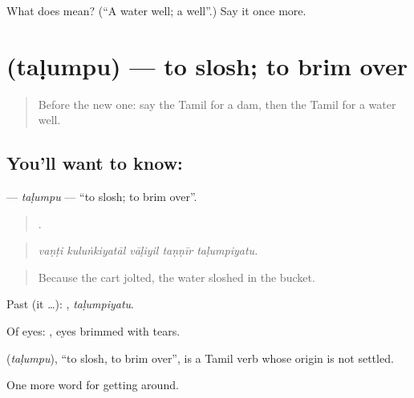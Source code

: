 \begin{tcolorbox}[breakable,colback=teal!4,colframe=teal!35!black,title={Before you move on}]
What does  mean? (\textquotedblleft{}A water well; a well\textquotedblright{}.) Say it once more.
\end{tcolorbox}
\section[\texorpdfstring{\ta{தளும்பு} (taḷumpu)}{தளும்பு (taḷumpu)}]{ (taḷumpu) — to slosh; to brim over}

\label{lesson:TA-C432-talumpu}



\begin{quote}
Before the new one: say the Tamil for a dam, then the Tamil for a water well.
\end{quote}

\subsection*{You'll want to know: }
\textbf{} — \emph{taḷumpu} — \textquotedblleft{}to slosh; to brim over\textquotedblright{}.

\begin{quote}
    .
\end{quote}

\begin{quote}
\emph{vaṇṭi kuluṅkiyatāl vāḷiyil taṇṇīr taḷumpiyatu.}
\end{quote}

\begin{quote}
Because the cart jolted, the water sloshed in the bucket.
\end{quote}

Past (it …): , \emph{taḷumpiyatu}.

Of eyes:  , eyes brimmed with tears.

\begin{cousinweb}
\textbf{} (\emph{taḷumpu}), \textquotedblleft{}to slosh, to brim over\textquotedblright{}, is a Tamil verb whose origin is not settled.
\end{cousinweb}

\begin{grammarlens}[title={What you've built}]
One more word for getting around.
\end{grammarlens}

